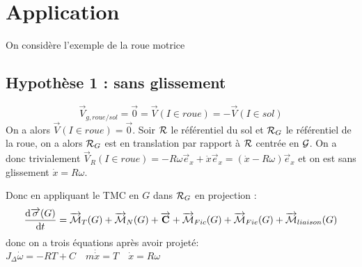 \documentclass[a4paper,french,bookmarks]{book}
\begin{document}
    \section{Application}

        On considère l'exemple de la roue motrice %
        \subsection{Hypothèse 1 : sans glissement}

            \[\vec V_{g,roue/sol} = \vec 0 = \vec V(I \in roue) = - \vec V\left( I \in sol\right)\]
            On a alors \(\vec V\left(I \in roue\right) = \vec 0\). Soir \(\mathcal{R}\) le référentiel du sol et \(\mathcal{R}_G\) le référentiel de la roue, on a alors \(\mathcal{R}_G\) est en translation par rapport à \(\mathcal{R}\) centrée en \(\mathcal{G}\). On a donc trivialement \(\vec V_R(I \in roue) = -R \omega \vec e_x + \dot{x} \vec e_x = (\dot{x} - R\omega)\vec e_x\) et on est sans glissement \(\dot x = R\omega\).

            Donc en appliquant le TMC en \(G\) dans \(\mathcal{R}_G\) en projection :
            \[ \dfrac{\mathrm d \overrightarrow{\sigma}(G)}{\mathrm d t} = \overrightarrow{\mathcal{M}}_T(G) + \overrightarrow{\mathcal{M}}_N(G) + \overrightarrow{\mathbf{C}} + \overrightarrow{\mathcal{M}}_{Fic}(G) + \overrightarrow{\mathcal{M}}_{Fie}(G) + \overrightarrow{\mathcal{M}}_{liaison}(G)\] donc on a trois équations après avoir projeté: \(J_{\Delta} \dot\omega = -RT+C \quad m\dot\dot x = T\quad \dot x = R\omega\)
        
\end{document}
